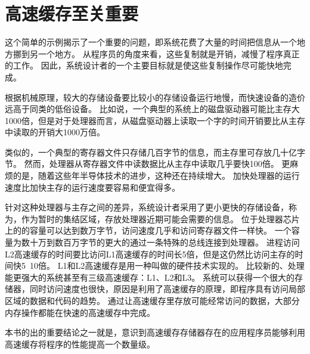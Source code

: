 \section{高速缓存至关重要}
{
    这个简单的示例揭示了一个重要的问题，即系统花费了大量的时间把信息从一个地方挪到另一个地方。
    从程序员的角度来看，这些复制就是开销，减慢了程序真正的工作。
    因此，系统设计者的一个主要目标就是使这些复制操作尽可能快地完成。

    根据机械原理，较大的存储设备要比较小的存储设备运行地慢，而快速设备的造价远高于同类的低俗设备。
    比如说，一个典型的系统上的磁盘驱动器可能比主存大1000倍，但是对于处理器而言，从磁盘驱动器上读取一个字的时间开销要比从主存中读取的开销大1000万倍。

    类似的，一个典型的寄存器文件只存储几百字节的信息，而主存里可存放几十亿字节。
    然而，处理器从寄存器文件中读数据比从主存中读取几乎要快100倍。
    更麻烦的是，随着这些年半导体技术的进步，这种还在持续增大。
    加快处理器的运行速度比加快主存的运行速度要容易和便宜得多。

    针对这种处理器与主存之间的差异，系统设计者采用了更小更快的存储设备，称为，作为暂时的集结区域，存放处理器近期可能会需要的信息。
    位于处理器芯片上的的容量可以达到数万字节，访问速度几乎和访问寄存器文件一样快。
    一个容量为数十万到数百万字节的更大的通过一条特殊的总线连接到处理器。
    进程访问L2高速缓存的时间要比访问L1高速缓存的时间长5倍，但是这仍然比访问主存的时间快5~10倍。
    L1和L2高速缓存是用一种叫做的硬件技术实现的。
    比较新的、处理能更强大的系统甚至有三级高速缓存：L1、L2和L3。
    系统可以获得一个很大的存储器，同时访问速度也很快，原因是利用了高速缓存的原理，即程序具有访问局部区域的数据和代码的趋势。
    通过让高速缓存里存放可能经常访问的数据，大部分内存操作都能在快速的高速缓存中完成。

    本书的出的重要结论之一就是，意识到高速缓存存储器存在的应用程序员能够利用高速缓存将程序的性能提高一个数量级。
}

\endinput
